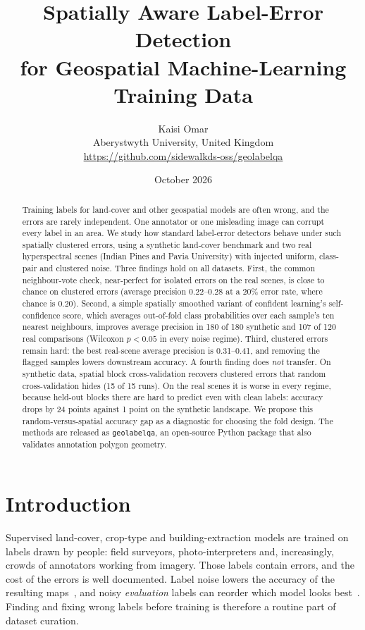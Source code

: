 \documentclass[11pt]{article}
\title{Spatially Aware Label-Error Detection\\for Geospatial Machine-Learning Training Data}
\author{Kaisi Omar\\[2pt]
\small Aberystwyth University, United Kingdom\\
\small\url{https://github.com/sidewalkds-oss/geolabelqa}}
\date{October 2026}
\begin{document}
\maketitle

\begin{abstract}
Training labels for land-cover and other geospatial models are often wrong, and
the errors are rarely independent. One annotator or one misleading image can
corrupt every label in an area. We study how standard label-error detectors
behave under such spatially clustered errors, using a synthetic land-cover
benchmark and two real hyperspectral scenes (Indian Pines and Pavia University)
with injected uniform, class-pair and clustered noise. Three findings hold on all
datasets. First, the common neighbour-vote check, near-perfect for isolated
errors on the real scenes, is close to chance on clustered errors (average
precision 0.22--0.28 at a 20\% error rate, where chance is 0.20). Second, a
simple spatially smoothed variant of confident learning's self-confidence score,
which averages out-of-fold class probabilities over each sample's ten nearest
neighbours, improves average precision in 180 of 180 synthetic and 107 of 120
real comparisons (Wilcoxon $p<0.05$ in every noise regime). Third, clustered
errors remain hard: the best real-scene average precision is 0.31--0.41, and
removing the flagged samples lowers downstream accuracy. A fourth finding does
\emph{not} transfer. On synthetic data, spatial block cross-validation recovers
clustered errors that random cross-validation hides (15 of 15 runs). On the
real scenes it is worse in every regime, because held-out blocks there are hard
to predict even with clean labels: accuracy drops by 24 points against 1 point on
the synthetic landscape. We propose this random-versus-spatial accuracy gap as a
diagnostic for choosing the fold design. The methods are released as
\texttt{geolabelqa}, an open-source Python package that also validates
annotation polygon geometry.
\end{abstract}

\section{Introduction}

Supervised land-cover, crop-type and building-extraction models are trained on
labels drawn by people: field surveyors, photo-interpreters and, increasingly,
crowds of annotators working from imagery. Those labels contain errors, and the
cost of the errors is well documented. Label noise lowers the accuracy of the
resulting maps~\citep{pelletier2017effect,mnih2012learning}, and noisy
\emph{evaluation} labels can reorder which model looks best~\citep{northcutt2021pervasive}.
Finding and fixing wrong labels before training is therefore a routine part of
dataset curation.
\end{document}
